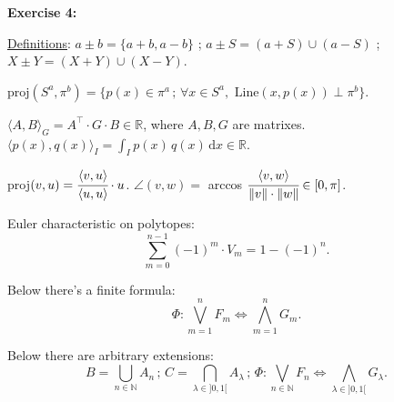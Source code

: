 \documentclass[11pt,a4paper]{article}
\begin{document}
		\Large
		\textbf{Exercise 4:}
		\small
		\vspace{3mm}

		\underline{Definitions}: $a \pm b = \{ a + b, a - b \}$ ; $a \pm S = (a + S) \cup (a - S)$ ; $X \pm Y = (X + Y) \cup (X - Y)$.

		$\text{proj}(S^a, \pi^b) = \{ p(x) \in \pi^a\,;\,\forall x \in S^a, \text{ Line}(x, p(x)) \perp \pi^b \}$.

		$\langle A, B\rangle_G = A^\top \cdot G \cdot B \in \mathbb{R}$, where $A,B,G$ are matrixes. $\langle p(x), q(x)\rangle_I = \int_I p(x)\,q(x)\,\mathrm{d}x \in \mathbb{R}$.

		proj$(v, u) = \cfrac{\langle v, u \rangle}{\langle u, u \rangle} \cdot u$. $\angle(v,w) =$ arccos $\cfrac{\langle v, w\rangle}{\Vert v\Vert \cdot \Vert w \Vert} \in [0, \pi]$.

		Euler characteristic on polytopes: $$\sum_{m = 0}^{n - 1} (-1)^m \cdot V_m = 1 - (-1)^n.$$

		Below there's a finite formula: $$\Phi:\bigvee_{m = 1}^n F_m\Leftrightarrow\bigwedge_{m = 1}^n G_m.$$

		Below there are arbitrary extensions: $$B = \bigcup_{n \in \mathbb{N}} A_n\,;\,C = \bigcap_{\lambda \in ]0,1[} A_\lambda\,;\,\Phi:\bigvee_{n \in \mathbb{N}} F_n\Leftrightarrow\bigwedge_{\lambda \in ]0,1[} G_\lambda.$$
\end{document}
